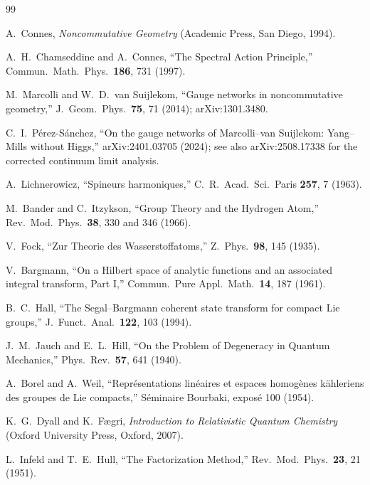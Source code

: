 \documentclass[twocolumn,pra,amsmath,amssymb,superscriptaddress]{revtex4-2}
\begin{document}
\begin{thebibliography}{99}

A.~Connes,
\textit{Noncommutative Geometry}
(Academic Press, San Diego, 1994).

A.~H.~Chamseddine and A.~Connes,
``The Spectral Action Principle,''
Commun.\ Math.\ Phys.\ \textbf{186}, 731 (1997).

M.~Marcolli and W.~D.~van Suijlekom,
``Gauge networks in noncommutative geometry,''
J.\ Geom.\ Phys.\ \textbf{75}, 71 (2014); arXiv:1301.3480.

C.~I.~P\'erez-S\'anchez,
``On the gauge networks of Marcolli--van Suijlekom: Yang--Mills
without Higgs,'' arXiv:2401.03705 (2024); see also arXiv:2508.17338
for the corrected continuum limit analysis.

A.~Lichnerowicz,
``Spineurs harmoniques,''
C.~R.\ Acad.\ Sci.\ Paris \textbf{257}, 7 (1963).

M.~Bander and C.~Itzykson,
``Group Theory and the Hydrogen Atom,''
Rev.\ Mod.\ Phys.\ \textbf{38}, 330 and 346 (1966).

V.~Fock,
``Zur Theorie des Wasserstoffatoms,''
Z.\ Phys.\ \textbf{98}, 145 (1935).

V.~Bargmann,
``On a Hilbert space of analytic functions and an associated
integral transform, Part I,''
Commun.\ Pure Appl.\ Math.\ \textbf{14}, 187 (1961).

B.~C.~Hall,
``The Segal--Bargmann coherent state transform for compact Lie
groups,''
J.\ Funct.\ Anal.\ \textbf{122}, 103 (1994).

J.~M.~Jauch and E.~L.~Hill,
``On the Problem of Degeneracy in Quantum Mechanics,''
Phys.\ Rev.\ \textbf{57}, 641 (1940).

A.~Borel and A.~Weil,
``Repr\'esentations lin\'eaires et espaces homog\`enes
k\"ahleriens des groupes de Lie compacts,''
S\'eminaire Bourbaki, expos\'e 100 (1954).

K.~G.~Dyall and K.~F\ae gri,
\textit{Introduction to Relativistic Quantum Chemistry}
(Oxford University Press, Oxford, 2007).

L.~Infeld and T.~E.~Hull,
``The Factorization Method,''
Rev.\ Mod.\ Phys.\ \textbf{23}, 21 (1951).


\end{thebibliography}
\end{document}
